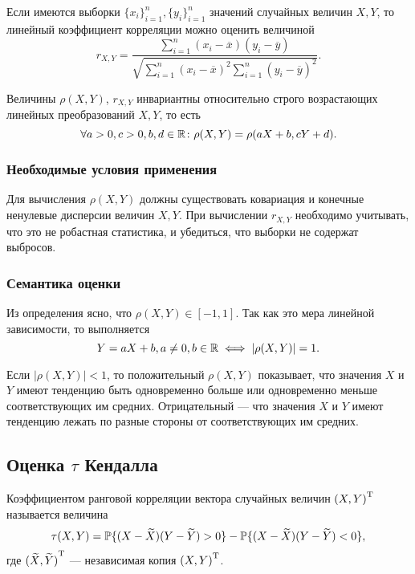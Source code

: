 Если имеются выборки $\{x_i\}_{i=1}^n, \{y_i\}_{i=1}^n$ значений случайных величин $X, Y$, то линейный коэффициент корреляции можно оценить величиной
\begin{equation}
r_{X, Y} = \frac{\sum_{i=1}^{n} (x_i - \overline{x})(y_i - \overline{y})}{\sqrt{\sum_{i=1}^{n} (x_i - \overline{x})^2 \sum_{i=1}^{n} (y_i - \overline{y})^2}}.
\end{equation}

Величины $\rho(X, Y)$, $r_{X, Y}$ инвариантны относительно строго возрастающих линейных преобразований $X, Y$, то есть
\[
\forall a > 0, c > 0, b, d \in \R \colon \rho(X, Y) = \rho(aX + b, cY + d).
\]

\subsubsection*{Необходимые условия применения}
Для вычисления $\rho(X, Y)$ должны существовать ковариация и конечные ненулевые дисперсии величин $X, Y$. При вычислении $r_{X, Y}$ необходимо учитывать, что это не робастная статистика, и убедиться, что выборки не содержат выбросов.
\subsubsection*{Семантика оценки}
Из определения ясно, что $\rho(X, Y) \in [-1, 1]$. Так как это мера линейной зависимости, то выполняется
\[
Y = aX + b, a \neq 0, b \in \R \iff |\rho(X, Y)| = 1.
\]

Если $|\rho(X, Y)| < 1$, то положительный $\rho(X, Y)$ показывает, что значения $X$ и $Y$ имеют тенденцию быть одновременно больше или одновременно меньше соответствующих им средних. Отрицательный --- что значения $X$ и $Y$ имеют тенденцию лежать по разные стороны от соответствующих им средних.

\subsection*{Оценка $\tau$ Кендалла}

\begin{define}
Коэффициентом ранговой корреляции вектора случайных величин $\trans{(X, Y)}$ называется величина
\begin{equation}
	\tau(X, Y) = \P\{(X - \widetilde{X})(Y - \widetilde{Y}) > 0\} - \P\{(X - \widetilde{X})(Y - \widetilde{Y}) < 0\},
\end{equation}
где $\trans{(\widetilde{X}, \widetilde{Y})}$ --- независимая копия $\trans{(X, Y)}$.
\end{define}

